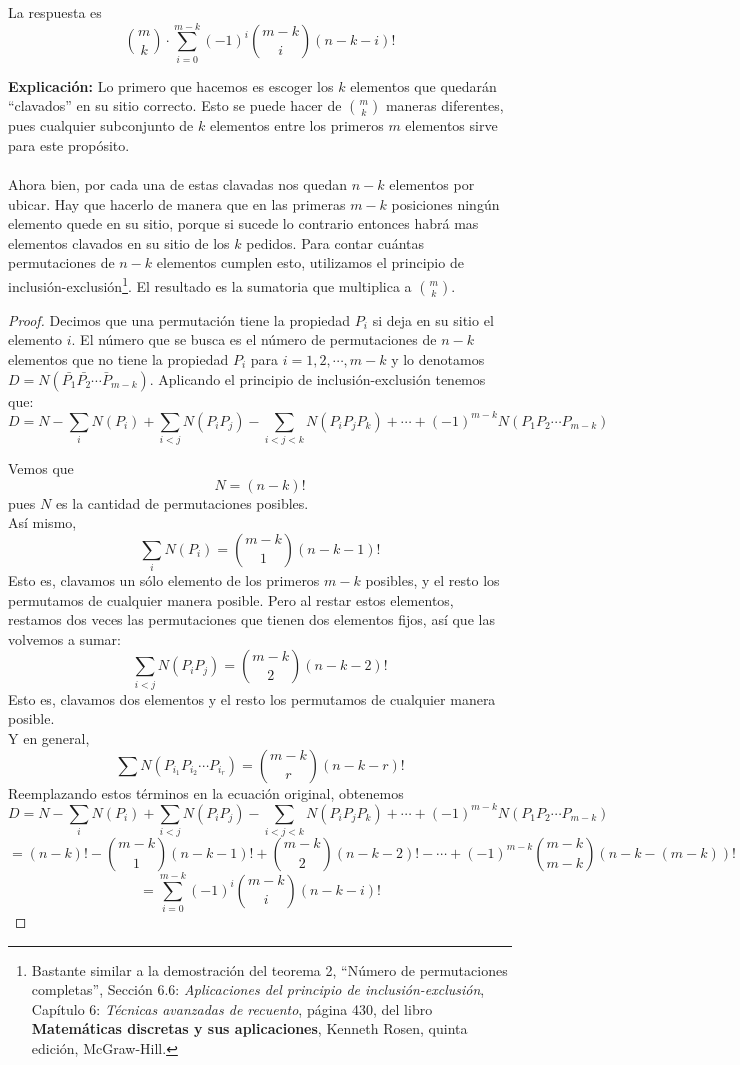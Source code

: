 \documentclass[10pt,letterpaper]{article}
\begin{document}
La respuesta es 
$$
{m \choose k} \cdot \displaystyle \sum_{i=0}^{m-k} (-1)^{i}  {m - k \choose i} (n-k-i)!
$$

\bigskip

\textbf{Explicación:} Lo primero que hacemos es escoger los $k$ elementos que quedarán ``clavados'' en su sitio correcto. Esto se puede hacer de $ {m \choose k} $ maneras diferentes, pues cualquier subconjunto de $k$ elementos entre los primeros $m$ elementos sirve para este propósito. \\
\\
Ahora bien, por cada una de estas clavadas nos quedan $ n - k $ elementos por ubicar. Hay que hacerlo de manera que en las primeras $ m - k $ posiciones ningún elemento quede en su sitio, porque si sucede lo contrario entonces habrá mas elementos clavados en su sitio de los $k$ pedidos. Para contar cuántas permutaciones de $n-k$ elementos cumplen esto, utilizamos el principio de inclusión-exclusión\footnote {Bastante similar a la demostración del teorema 2, ``Número de permutaciones completas'', Sección 6.6: \textit{Aplicaciones del principio de inclusión-exclusión}, Capítulo 6: \textit{Técnicas avanzadas de recuento}, página 430, del libro \textbf{Matemáticas discretas y sus aplicaciones}, Kenneth Rosen, quinta edición, McGraw-Hill.}. El resultado es la sumatoria que multiplica a ${ m \choose k}$.\\

\begin{proof}{}
Decimos que una permutación tiene la propiedad $P_{i}$ si deja en su sitio el elemento $i$. El número que se busca es el número de permutaciones de $n - k$ elementos que no tiene la propiedad $P_{i}$ para $i=1, 2, \cdots , m - k$ y lo denotamos $ D = N(\bar{P_{1}} \bar{P_{2}} \cdots \bar{P}_{m-k}) $. Aplicando el principio de inclusión-exclusión tenemos que:\\
$$
D = N - \sum_{i}{N(P_{i})} + \sum_{i < j}{N(P_{i}P_{j})} - \sum_{i < j < k}{N(P_{i}P_{j}P_{k})} + \cdots + (-1)^{m-k}N(P_{1}P_{2} \cdots P_{m-k})
$$

Vemos que $$ N = (n-k)! $$ pues $N$ es la cantidad de permutaciones posibles.\\
Así mismo, $$ \sum_{i}{N(P_{i})} = { m - k \choose 1 } (n -k -1)! $$ Esto es, clavamos un sólo elemento de los primeros $m - k$ posibles, y el resto los permutamos de cualquier manera posible. Pero al restar estos elementos, restamos dos veces las permutaciones que tienen dos elementos fijos, así que las volvemos a sumar:
$$\sum_{i < j}{N(P_{i}P_{j})} = { m - k \choose 2 } (n -k -2)! $$
Esto es, clavamos dos elementos y el resto los permutamos de cualquier manera posible.\\
Y en general,
$$\sum{N(P_{i_{1}}P_{i_{2}} \cdots P_{i_{r}})} = { m - k \choose r } (n -k -r)! $$
Reemplazando estos términos en la ecuación original, obtenemos
$$
D = N - \sum_{i}{N(P_{i})} + \sum_{i < j}{N(P_{i}P_{j})} - \sum_{i < j < k}{N(P_{i}P_{j}P_{k})} + \cdots + (-1)^{m-k}N(P_{1}P_{2} \cdots P_{m-k}) $$
$$
= (n - k)! - { m - k \choose 1 } (n -k -1)! +  { m - k \choose 2 } (n -k -2)! - 
 \cdots + (-1)^{m-k}  { m - k \choose m - k } (n -k -(m - k))!
$$
$$
= \sum_{i=0}^{m-k} (-1)^{i}  {m - k \choose i} (n-k-i)!
$$
\end{proof}
\end{document}
